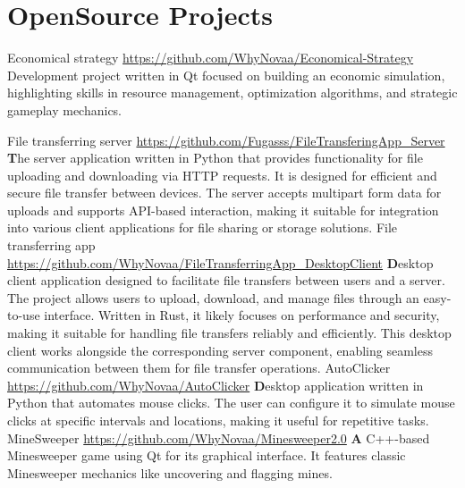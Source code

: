 \documentclass[11pt,a4paper]{moderncv}
\begin{document}
\maketitle

\section{OpenSource Projects}
  \cvline
    {Economical strategy}
    {\url{https://github.com/WhyNovaa/Economical-Strategy}\newline{}
    \textbfgame Development project written in Qt focused on building an economic simulation, highlighting skills in resource management, optimization algorithms, and strategic gameplay mechanics.\newline{}
    }

  \cvline
    {File transferring server}
    {\url{https://github.com/Fugasss/FileTransferingApp_Server}\newline{}
    \textbf
    The server application written in Python that provides functionality for file uploading and downloading via HTTP requests. It is designed for efficient and secure file transfer between devices. The server accepts multipart form data for uploads and supports API-based interaction, making it suitable for integration into various client applications for file sharing or storage solutions.\newline{}
    }
  \cvline
    {File transferring app}
    {\url{https://github.com/WhyNovaa/FileTransferringApp_DesktopClient}\newline{}
    \textbf
    Desktop client application designed to facilitate file transfers between users and a server. The project allows users to upload, download, and manage files through an easy-to-use interface. Written in Rust, it likely focuses on performance and security, making it suitable for handling file transfers reliably and efficiently. This desktop client works alongside the corresponding server component, enabling seamless communication between them for file transfer operations.\newline{}
    }
  \cvline 
    {AutoClicker}
    {\url{https://github.com/WhyNovaa/AutoClicker}\newline{}
    \textbf Desktop application written in Python that automates mouse clicks. The user can configure it to simulate mouse clicks at specific intervals and locations, making it useful for repetitive tasks.\newline{}
    }
  \cvline
    {MineSweeper}
    {\url{https://github.com/WhyNovaa/Minesweeper2.0}\newline{}
    \textbf A C++-based Minesweeper game using Qt for its graphical interface. It features classic Minesweeper mechanics like uncovering and flagging mines.\newline{}
    }
    
\end{document}
